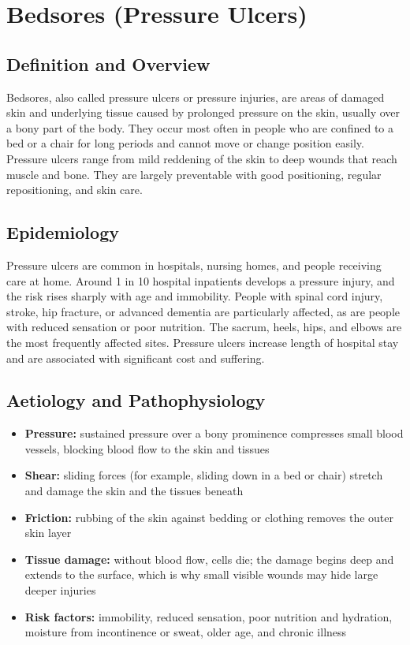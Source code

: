 \chapter{Bedsores (Pressure Ulcers)}

\section*{Definition and Overview}
Bedsores, also called pressure ulcers or pressure injuries, are areas of damaged skin and underlying tissue caused by prolonged pressure on the skin, usually over a bony part of the body. They occur most often in people who are confined to a bed or a chair for long periods and cannot move or change position easily. Pressure ulcers range from mild reddening of the skin to deep wounds that reach muscle and bone. They are largely preventable with good positioning, regular repositioning, and skin care.

\section*{Epidemiology}
Pressure ulcers are common in hospitals, nursing homes, and people receiving care at home. Around 1 in 10 hospital inpatients develops a pressure injury, and the risk rises sharply with age and immobility. People with spinal cord injury, stroke, hip fracture, or advanced dementia are particularly affected, as are people with reduced sensation or poor nutrition. The sacrum, heels, hips, and elbows are the most frequently affected sites. Pressure ulcers increase length of hospital stay and are associated with significant cost and suffering.

\section*{Aetiology and Pathophysiology}
\begin{itemize}
    \item \textbf{Pressure:} sustained pressure over a bony prominence compresses small blood vessels, blocking blood flow to the skin and tissues
    \item \textbf{Shear:} sliding forces (for example, sliding down in a bed or chair) stretch and damage the skin and the tissues beneath
    \item \textbf{Friction:} rubbing of the skin against bedding or clothing removes the outer skin layer
    \item \textbf{Tissue damage:} without blood flow, cells die; the damage begins deep and extends to the surface, which is why small visible wounds may hide large deeper injuries
    \item \textbf{Risk factors:} immobility, reduced sensation, poor nutrition and hydration, moisture from incontinence or sweat, older age, and chronic illness
\end{itemize}

